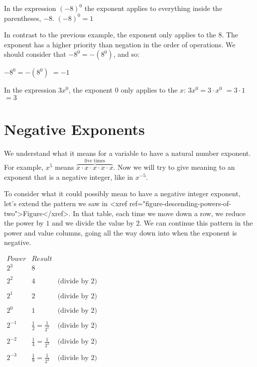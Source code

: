 \documentclass{ximera}
\begin{document}
       In the expression $(-8)^0$ the exponent applies to everything inside the parentheses,
                    $-8$.
                    $
                      (-8)^0  =  1
                    $

       In contrast to the previous example,
                    the exponent only applies to the $8$.
                    The exponent has a higher priority than negation in the order of operations.
                    We should consider that $-8^0 = -\left(8^0\right)$, and so:
                   
                      $-8^0  =  -\left(8^0\right)$
                      $=  -1$

      In the expression $3x^0$,
                    the exponent $0$ only applies to the $x$:
                      $3x^0 = 3\cdot x^0$
                      $= 3\cdot 1$
                      $= 3$
\section{Negative Exponents}
   We understand what it means for a variable to have a natural number exponent.
      For example, $x^5$ means $\overbrace{x\cdot x\cdot x\cdot x\cdot x}^{\text{five times}}$.
      Now we will try to give meaning to an exponent that is a negative integer,
      like in $x^{-5}$.

        To consider what it could possibly mean to have a negative integer exponent,
        let's extend the pattern we saw in <xref ref="figure-descending-powers-of-two">Figure</xref>.
        In that table, each time we move down a row,
        we reduce the power by $1$ and we divide the value by $2$.
        We can continue this pattern in the power and value columns,
        going all the way down into when the exponent is negative.
\begin{center}
$
  \begin{array}{ccc}
            Power & Result & \\
        \hline
            2^3 & 8 & \\
\\
              2^2 & 4 & \text{(divide by 2)} \\
\\
               2^1 & 2 & \text{(divide by 2)} \\
\\
                     2^0 & 1 & \text{(divide by 2)} \\
\\
           2^{-1} & \frac{1}{2}=\frac{1}{2^1} & \text{(divide by 2)} \\   
\\       
           2^{-2} & \frac{1}{4}=\frac{1}{2^2} & \text{(divide by 2)} \\
\\
                   2^{-3} & \frac{1}{8}=\frac{1}{2^3} & \text{(divide by 2)} \\          
     \end{array}
$
\end{center}
\end{document}
